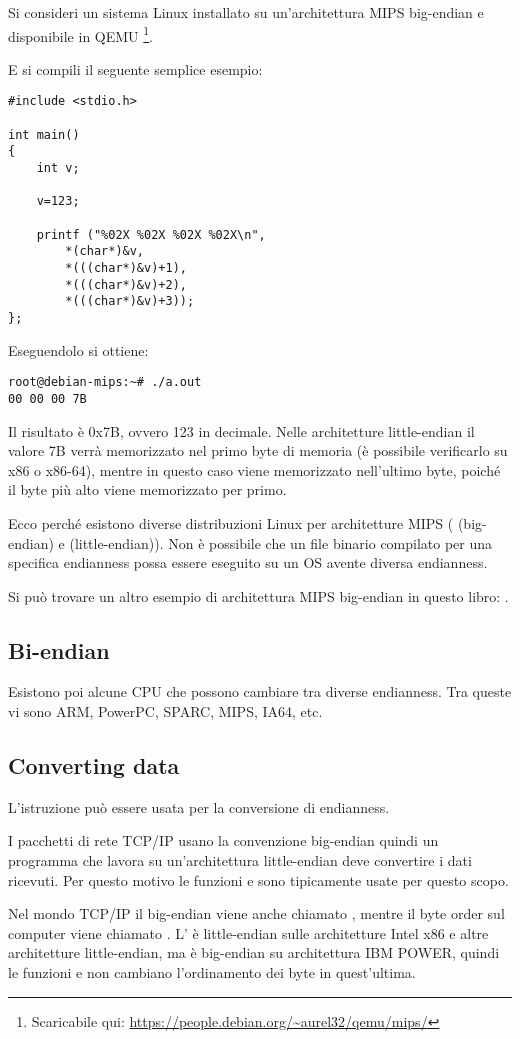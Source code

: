 Si consideri un sistema Linux installato su un'architettura MIPS big-endian e disponibile in QEMU
\footnote{Scaricabile qui: \url{https://people.debian.org/~aurel32/qemu/mips/}}.

E si compili il seguente semplice esempio:

\begin{lstlisting}[style=customc]
#include <stdio.h>

int main()
{
	int v;

	v=123;

	printf ("%02X %02X %02X %02X\n", 
		*(char*)&v,
		*(((char*)&v)+1),
		*(((char*)&v)+2),
		*(((char*)&v)+3));
};
\end{lstlisting}

Eseguendolo si ottiene:

\begin{lstlisting}
root@debian-mips:~# ./a.out 
00 00 00 7B
\end{lstlisting}

Il risultato è
0x7B, ovvero 123 in decimale.
Nelle architetture little-endian il valore 7B verrà memorizzato nel primo byte di memoria (è possibile verificarlo su x86 o x86-64), 
mentre in questo caso viene memorizzato nell'ultimo byte, poiché il byte più alto viene memorizzato per primo.

Ecco perché esistono diverse distribuzioni Linux per architetture MIPS
( (big-endian) e  (little-endian)).
Non è possibile che un file binario compilato per una specifica endianness possa essere eseguito su un \ac{OS} avente diversa endianness.

Si può trovare un altro esempio di architettura MIPS big-endian in questo libro: .

\subsection{Bi-endian}

Esistono poi alcune CPU che possono cambiare tra diverse endianness. Tra queste vi sono ARM, PowerPC, SPARC, MIPS, \ac{IA64}, etc.

\subsection{Converting data}

L'istruzione  può essere usata per la conversione di endianness.

I pacchetti di rete TCP/IP usano la convenzione big-endian quindi un programma che lavora su un'architettura little-endian deve convertire i dati ricevuti.
Per questo motivo le funzioni  e  sono tipicamente usate per questo scopo.

Nel mondo TCP/IP il big-endian viene anche chiamato , mentre il byte order sul computer viene chiamato .
L' è little-endian sulle architetture Intel x86 e altre architetture little-endian,
ma è big-endian su architettura IBM POWER, quindi le funzioni  e  non cambiano l'ordinamento dei byte in quest'ultima.

